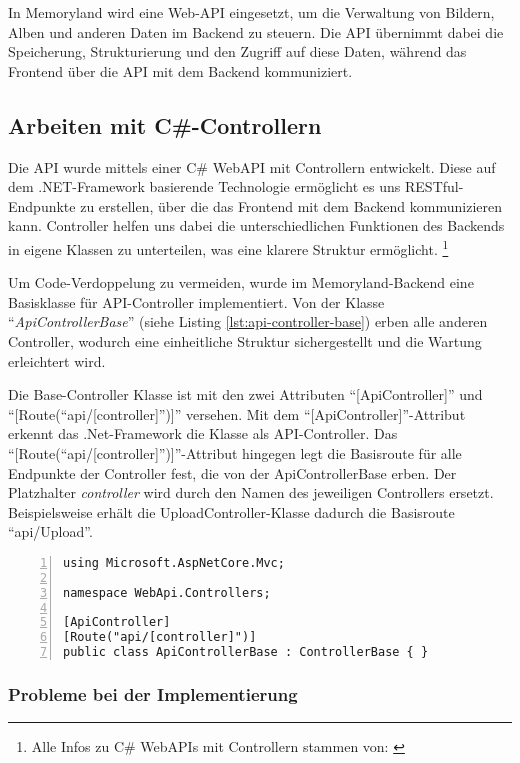 In Memoryland wird eine Web-API eingesetzt, um die Verwaltung von Bildern, Alben
und anderen Daten im Backend zu steuern. Die API übernimmt dabei die Speicherung, 
Strukturierung und den Zugriff auf diese Daten, während das Frontend über die API 
mit dem Backend kommuniziert.

\subsection{Arbeiten mit C\#-Controllern}

Die API wurde mittels einer C\# WebAPI mit Controllern entwickelt. Diese auf dem .NET-Framework
basierende Technologie ermöglicht es uns RESTful-Endpunkte zu erstellen, über die das Frontend
mit dem Backend kommunizieren kann. Controller helfen uns dabei die unterschiedlichen Funktionen
des Backends in eigene Klassen zu unterteilen, was eine klarere Struktur ermöglicht.
\footnote{Alle Infos zu C\# WebAPIs mit Controllern stammen von: \cite{MicrosoftCorporationaa}}

Um Code-Verdoppelung zu vermeiden, wurde im Memoryland-Backend eine Basisklasse 
für API-Controller implementiert. Von der Klasse ``\emph{ApiControllerBase}'' (siehe Listing \ref{lst:api-controller-base}) 
erben alle anderen Controller, wodurch eine einheitliche Struktur sichergestellt und die Wartung 
erleichtert wird.

Die Base-Controller Klasse ist mit den zwei Attributen ``[ApiController]'' und 
``[Route(``api/[controller]'')]'' versehen. Mit dem ``[ApiController]''-Attribut 
erkennt das .Net-Framework die Klasse als API-Controller. Das 
``[Route(``api/[controller]'')]''-Attribut hingegen legt die Basisroute für alle Endpunkte 
der Controller fest, die von der ApiControllerBase erben. 
Der Platzhalter \emph{controller} wird durch den Namen des jeweiligen Controllers ersetzt. 
Beispielsweise erhält die UploadController-Klasse dadurch die Basisroute ``api/Upload''.

\begin{lstlisting}[numbers=left,caption={APIControllerBase.cs},label={lst:api-controller-base}]
using Microsoft.AspNetCore.Mvc;

namespace WebApi.Controllers;
    
[ApiController]
[Route("api/[controller]")]
public class ApiControllerBase : ControllerBase { }    
\end{lstlisting}

\subsubsection{Probleme bei der Implementierung}

